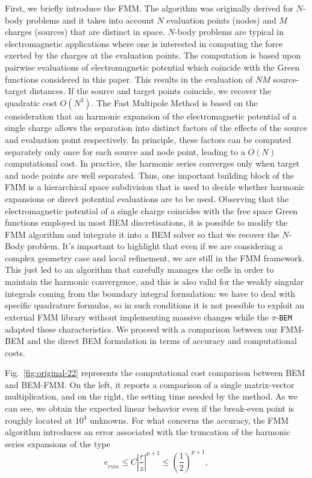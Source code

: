 First, we briefly introduce the FMM. The algorithm was originally derived for $N$-body
problems and it takes into account $N$ evaluation points (nodes) and $M$ charges (sources) that
are distinct in space. $N$-body problems are typical in electromagnetic applications where
one is interested in computing the force exerted by the charges at the evaluation points. The computation is based upon pairwise evaluations of electromagnetic
potential which coincide with the Green functions considered in this paper. This results in the
evaluation of $NM$ source-target distances. If the source and target points coincide, we
recover the quadratic cost $O(N^2)$. The Fast Multipole Method is based on the consideration
that an harmonic expansion of the electromagnetic potential of a single charge allows the
separation into distinct factors of the effects of the source and evaluation point respectively.
In principle, these factors can be computed separately only once for each source and node
point, leading to a $O(N)$ computational cost. In practice, the harmonic series converges only
when target and node points are well separated. Thus, one important building block of the
FMM is a hierarchical space subdivision that is used to decide whether harmonic
expansions or direct potential evaluations are to be used. Observing that the
electromagnetic potential of a single charge coincides with the free space Green functions
employed in most BEM discretisations, it is possible to modify the FMM algorithm and
integrate it into a BEM solver so that we recover the $N$-Body problem. It’s important to
highlight that even if we are considering a complex geometry case and local refinement, we
are still in the FMM framework. This just led to an algorithm that carefully manages the cells in
order to maintain the harmonic convergence, and this is also valid for the weakly singular integrals coming from the boundary integral formulation: we have to deal with specific quadrature formulas, so in such conditions it is not possible to exploit an external FMM library without implementing massive changes while the $\pi$-\texttt{BEM} adapted these characteristics. We
proceed with a comparison between our FMM-BEM and the direct BEM formulation in terms of accuracy and computational costs.

Fig.~\ref{fig:original-22} represents the computational cost comparison between BEM and BEM-FMM. On
the left, it reports a comparison of a single matrix-vector multiplication, and on the right, the setting time needed by the method. As we can see, we obtain the expected linear behavior even if
the break-even point is roughly located at $10^4$ unknowns. For what concerns the accuracy,
the FMM algorithm introduces an error associated with the truncation of the harmonic series
expansions of the type
\begin{equation*}
e_{_\text{FMM}}\leq C \left| \frac{r}{z}  \right|^{p+1}\leq \left( \frac{1}{2}  \right)^{p+1},
\end{equation*}

